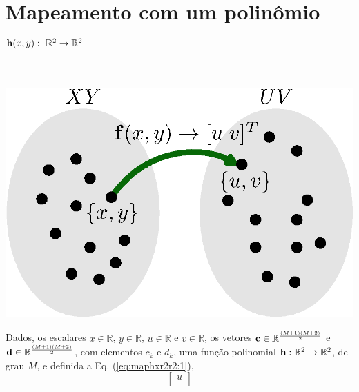 


\section{ Mapeamento com um polinômio $\VECTOR{h}(x,y):~\mathbb{R}^2 \rightarrow \mathbb{R}^2$}


\begin{theorem}
\label{theo:maphxr2r2}
~\\
\begin{minipage}{0.45\textwidth}
\centering
\includegraphics[width=0.95\linewidth]{chapters/mapeamento/mapeamento.eps} 
\end{minipage}
\begin{minipage}{0.55\textwidth}
Dados,
os escalares 
$x \in \mathbb{R}$, 
$y \in \mathbb{R}$, 
$u \in \mathbb{R}$ e 
$v \in \mathbb{R}$,
os vetores $\VECTOR{c} \in \mathbb{R}^{\frac{(M+1)(M+2)}{2}}$ e
$\VECTOR{d} \in \mathbb{R}^{\frac{(M+1)(M+2)}{2}}$,
com elementos $c_k$ e $d_k$,
uma função polinomial $\VECTOR{h}:\mathbb{R}^2 \rightarrow \mathbb{R}^2$, de grau $M$, e 
definida a Eq. (\ref{eq:maphxr2r2:1}),
\begin{equation}\label{eq:maphxr2r2:1}
\begin{bmatrix}
u\\

\end{bmatrix}
\end{equation}
\end{minipage}
\end{theorem}
